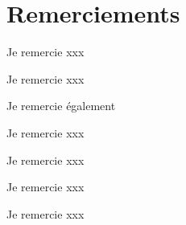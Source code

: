 \chapter*{Remerciements}

Je remercie xxx \lipsum[66]

\bigskip

Je remercie xxx \lipsum[66]

\bigskip

Je remercie également \lipsum[66]

\bigskip

Je remercie xxx \lipsum[66]

\bigskip

Je remercie xxx \lipsum[66]

\bigskip

Je remercie xxx \lipsum[66]

\bigskip

Je remercie xxx \lipsum[66]


\newpage
\thispagestyle{empty}
\mbox{}
\newpage